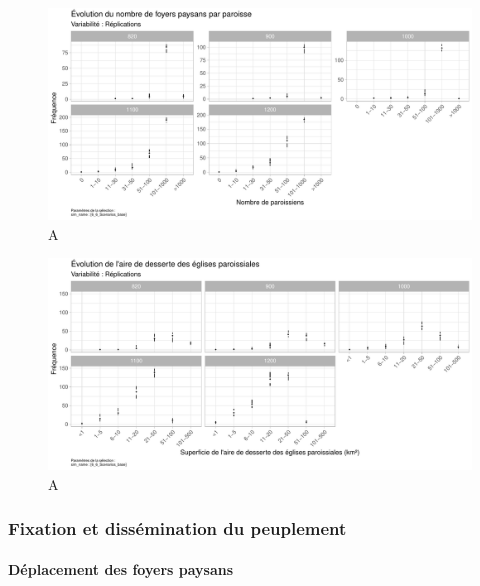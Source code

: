 \begin{figure}[H]
	\centering
	\includegraphics[width=\linewidth]{img/results_6_6/Paroisses_Compo_Haut.pdf}
	\caption{A}
	\label{}
\end{figure}
\begin{figure}[H]
	\centering
	\includegraphics[width=\linewidth]{img/results_6_6/Paroisses_Superficie_Haut.pdf}
	\caption{A}
	\label{}
\end{figure}


\subsubsection{Fixation et dissémination du peuplement}

\paragraph{Déplacement des foyers paysans}~\\

